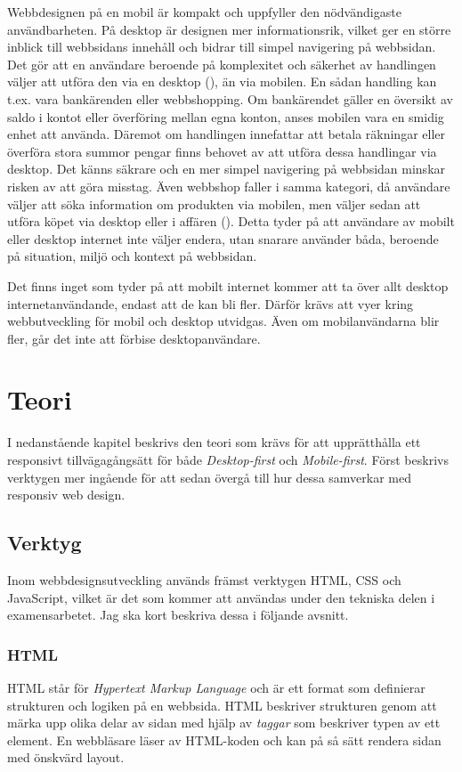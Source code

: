\documentclass[11pt]{article}
\begin{document}
Webbdesignen på en mobil är kompakt och uppfyller den nödvändigaste användbarheten. På desktop är designen mer informationsrik, vilket ger en större inblick till webbsidans innehåll och bidrar till simpel navigering på webbsidan. Det gör att en användare beroende på komplexitet och säkerhet av handlingen väljer att utföra den via en desktop (\cite{userbeh}), än via mobilen. En sådan handling kan t.ex. vara bankärenden eller webbshopping. Om bankärendet gäller en översikt av saldo i kontot eller överföring mellan egna konton, anses mobilen vara en smidig enhet att använda. Däremot om handlingen innefattar att betala räkningar eller överföra stora summor pengar finns behovet av att utföra dessa handlingar via desktop. Det känns säkrare och en mer simpel navigering på webbsidan minskar risken av att göra misstag. Även webbshop faller i samma kategori, då användare väljer att söka information om produkten via mobilen, men väljer sedan att utföra köpet via desktop eller i affären (\cite{userbeh}). Detta tyder på att användare av mobilt eller desktop internet inte väljer endera, utan snarare använder båda, beroende på situation, miljö och kontext på webbsidan.

Det finns inget som tyder på att mobilt internet kommer att ta över allt desktop internetanvändande, endast att de kan bli fler. Därför krävs att vyer kring webbutveckling för mobil och desktop utvidgas. Även om mobilanvändarna blir fler, går det inte att förbise desktopanvändare.
\newpage

\section{Teori}
I nedanstående kapitel beskrivs den teori som krävs för att upprätthålla ett responsivt tillvägagångsätt för både \textit{Desktop-first} och \textit{Mobile-first}. Först beskrivs verktygen mer ingående för att sedan övergå till hur dessa samverkar med responsiv web design.

\subsection{Verktyg}

Inom webbdesignsutveckling används främst verktygen HTML, CSS och JavaScript, vilket är det som kommer att användas under den tekniska delen i examensarbetet. Jag ska kort beskriva dessa i följande avsnitt.

\subsubsection{HTML}
HTML står för \textit{Hypertext Markup Language} och är ett format som definierar strukturen och logiken på en webbsida. HTML beskriver strukturen genom att märka upp olika delar av sidan med hjälp av \textit{taggar} som beskriver typen av ett element. En webbläsare läser av HTML-koden och kan på så sätt rendera sidan med önskvärd layout.
\end{document}

